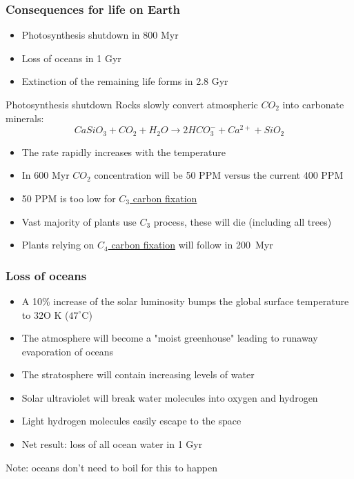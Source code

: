 \documentclass{beamer}
\begin{document}
\begin{frame}
\frametitle{Consequences for life on Earth}

\begin{itemize}
\item{Photosynthesis shutdown in 800 Myr}
\item{Loss of oceans in 1 Gyr}
\item{Extinction of the remaining life forms in 2.8 Gyr}
\end{itemize}
\end{frame}


\begin{frame}{Photosynthesis shutdown}
Rocks slowly convert atmospheric $CO_2$ into carbonate minerals:
\begin{displaymath}
\nonumber
Ca Si O_3 + CO_2 + H_2 O \to 2 H CO_3^- + Ca^{2+} + Si O_2
\end{displaymath}

\begin{itemize}
\item The rate rapidly increases with the temperature
\item In 600 Myr $CO_2$ concentration will be 50 PPM \cite{arXiv:0912.2482} versus the current 400 PPM
\item 50 PPM is too low for \href{http://en.wikipedia.org/wiki/C3_carbon_fixation}{$C_3$ carbon fixation}
\item Vast majority of plants use $C_3$ process, these will die (including all trees)
\item Plants relying on \href{http://en.wikipedia.org/wiki/C4_carbon_fixation}{$C_4$ carbon fixation} will follow in 200~Myr
\end{itemize}
\end{frame}


\begin{frame}
\frametitle{Loss of oceans}
\begin{itemize}
\item A 10\% increase of the solar luminosity bumps the global surface temperature to 32O K ($47^\circ \mathrm{C}$)
\item The atmosphere will become a "moist greenhouse" leading to runaway
  evaporation of oceans \cite{James F. Kasting}
\item The stratosphere will contain increasing levels of water
\item Solar ultraviolet will break water molecules into oxygen and hydrogen
\item Light hydrogen molecules easily escape to the space
\item Net result: loss of all ocean water in 1 Gyr
\end{itemize}

Note: oceans don't need to boil for this to happen
\end{frame}
\end{document}
